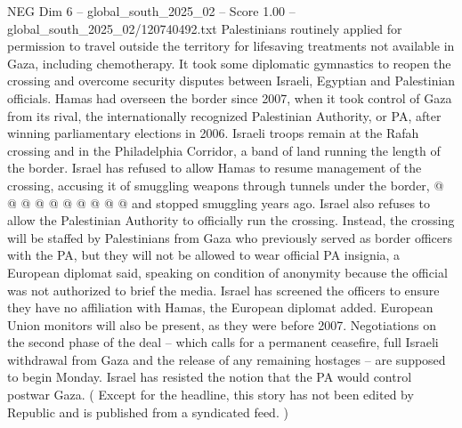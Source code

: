 \begin{textsample}{NEG Dim 6 – global\_south\_2025\_02 – Score 1.00 – global\_south\_2025\_02/120740492.txt}
Palestinians routinely applied for permission to travel outside the territory for lifesaving treatments not available in Gaza, including chemotherapy.
It took some diplomatic gymnastics to reopen the crossing and overcome security disputes between Israeli, Egyptian and Palestinian officials.
Hamas had overseen the border since 2007, when it took control of Gaza from its rival, the internationally recognized Palestinian Authority, or PA, after winning parliamentary elections in 2006.
Israeli troops remain at the Rafah crossing and in the Philadelphia Corridor, a band of land running the length of the border.
Israel has refused to allow Hamas to resume management of the crossing, accusing it of smuggling weapons through tunnels under the border, @ @ @ @ @ @ @ @ @ @ and stopped smuggling years ago.
Israel also refuses to allow the Palestinian Authority to officially run the crossing.
Instead, the crossing will be staffed by Palestinians from Gaza who previously served as border officers with the PA, but they will not be allowed to wear official PA insignia, a European diplomat said, speaking on condition of anonymity because the official was not authorized to brief the media.
Israel has screened the officers to ensure they have no affiliation with Hamas, the European diplomat added.
European Union monitors will also be present, as they were before 2007.
Negotiations on the second phase of the deal -- which calls for a permanent ceasefire, full Israeli withdrawal from Gaza and the release of any remaining hostages -- are supposed to begin Monday.
Israel has resisted the notion that the PA would control postwar Gaza. ( Except for the headline, this story has not been edited by Republic and is published from a syndicated feed. )

\end{textsample}
